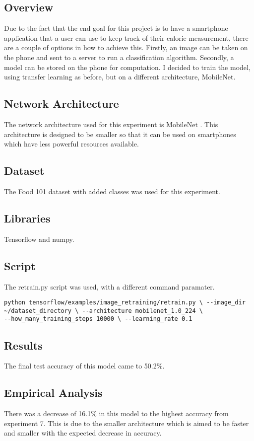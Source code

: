 \subsection*{Overview}
Due to the fact that the end goal for this project is to have a smartphone
application that a user can use to keep track of their calorie measurement,
there are a couple of options in how to achieve this. Firstly, an image can be
taken on the phone and sent to a server to run a classification algorithm.
Secondly, a model can be stored on the phone for computation. I decided to train
the model, using transfer learning as before, but on a different architecture,
MobileNet.

\subsection*{Network Architecture}
The network architecture used for this experiment is MobileNet
\textcite{retrainInception}. This architecture is designed to be smaller so that
it can be used on smartphones which have less powerful resources available.

\subsection*{Dataset}
The Food 101 dataset \textcite{food101} with added classes was used for this experiment.

\subsection*{Libraries}
Tensorflow and numpy.

\subsection*{Script}
The retrain.py script \textcite{retrainInception} was used, with a different
command paramater.

\begin{lstlisting}
python tensorflow/examples/image_retraining/retrain.py \ --image_dir
~/dataset_directory \ --architecture mobilenet_1.0_224 \
--how_many_training_steps 10000 \ --learning_rate 0.1
\end{lstlisting}

\subsection*{Results}
The final test accuracy of this model came to 50.2\%.

\subsection*{Empirical Analysis}
There was a decrease of 16.1\% in this model to the highest accuracy from
experiment 7. This is due to the smaller architecture which is aimed to be faster
and smaller with the expected decrease in accuracy.
